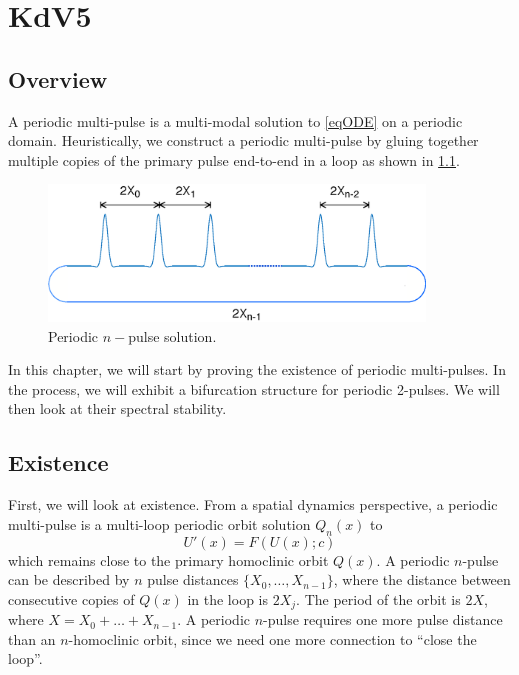 \documentclass[thesis.tex]{subfiles}
\begin{document}
\iffulldocument\else
	\chapter{KdV5}
\fi

\section{Overview}

A periodic multi-pulse is a multi-modal solution to \cref{eqODE} on a periodic domain. Heuristically, we construct a periodic multi-pulse by gluing together multiple copies of the primary pulse end-to-end in a loop as shown in \cref{fig:permultipulse}.
\begin{figure}
\includegraphics[width=10cm]{periodic/multipulseperiodic}
\caption{Periodic $n-$pulse solution.}
\label{fig:permultipulse}
\end{figure}

In this chapter, we will start by proving the existence of periodic multi-pulses. In the process, we will exhibit a bifurcation structure for periodic 2-pulses. We will then look at their spectral stability.

\section{Existence}

First, we will look at existence. From a spatial dynamics perspective, a periodic multi-pulse is a multi-loop periodic orbit solution $Q_n(x)$ to
\begin{equation}\label{existgenODE}
U'(x) = F(U(x); c)
\end{equation}
which remains close to the primary homoclinic orbit $Q(x)$. A periodic $n$-pulse can be described by $n$ pulse distances $\{X_0, \dots, X_{n-1} \}$, where the distance between consecutive copies of $Q(x)$ in the loop is $2 X_j$. The period of the orbit is $2X$, where $X = X_0 + \dots + X_{n-1}$. A periodic $n$-pulse requires one more pulse distance than an $n$-homoclinic orbit, since we need one more connection to ``close the loop''.  
\end{document}
